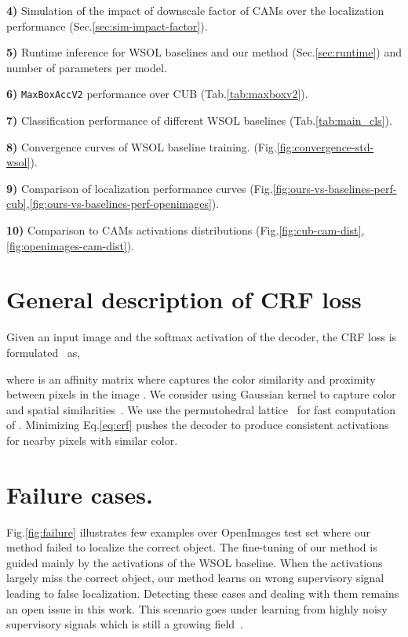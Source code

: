 \documentclass[twocolumn]{article}
\newcommand\newmaxboxacc{\texttt{MaxBoxAccV2}\xspace}
\theoremstyle{definition}
\begin{document}
\noindent \textbf{4)} Simulation of the impact of downscale factor of CAMs over the localization performance (Sec.\ref{sec:sim-impact-factor}).

\noindent \textbf{5)} Runtime inference for WSOL baselines and our method (Sec.\ref{sec:runtime}) and number of parameters per model.

\noindent \textbf{6)} \newmaxboxacc performance over CUB (Tab.\ref{tab:maxboxv2}).

\noindent  \textbf{7)} Classification performance of different WSOL baselines (Tab.\ref{tab:main_cls}).

\noindent  \textbf{8)} Convergence curves of WSOL baseline training. (Fig.\ref{fig:convergence-std-wsol}).

\noindent  \textbf{9)} Comparison of localization performance curves (Fig.\ref{fig:ours-vs-baselines-perf-cub},\ref{fig:ours-vs-baselines-perf-openimages}).

\noindent  \textbf{10)} Comparison to CAMs activations distributions (Fig.\ref{fig:cub-cam-dist}, \ref{fig:openimages-cam-dist}).


\section{General description of CRF loss}
\label{sec:crf}
Given an input image  and the softmax activation  of the decoder, the CRF loss is formulated~\cite{tang2018regularized}  as,

where  is an affinity matrix where  captures the color similarity and proximity between pixels  in the image . We consider using Gaussian kernel to capture color and spatial similarities~\cite{KrahenbuhlK11crf}. We use the permutohedral lattice~\cite{AdamsBD10lattice} for fast computation of . Minimizing Eq.\ref{eq:crf} pushes the decoder to produce consistent activations for nearby pixels with similar color.


\section{Failure cases.}
\label{sec:fail}

Fig.\ref{fig:failure} illustrates few examples over OpenImages test set where our method failed to localize the correct object. The fine-tuning of our method is guided mainly by the activations of the WSOL baseline. When the activations largely miss the correct object, our method learns on wrong supervisory signal leading to false localization. Detecting these cases and dealing with them remains an open issue in this work. This scenario goes under learning from highly noisy supervisory signals which is still a growing field~\cite{songsurvey2020}.
\end{document}
